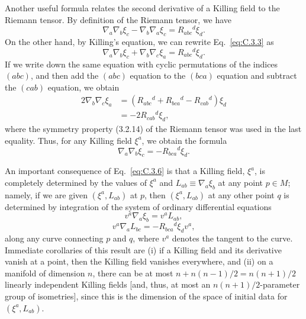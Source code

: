 Another useful formula relates the second derivative of a Killing field to the Riemann
tensor. By definition of the Riemann tensor, we have
\begin{equation}
  \nabla_a\nabla_b\xi_c-\nabla_b\nabla_a\xi_c
  =R_{abc}{}^d\xi_d.
  \tag{C.3.3}\label{eq:C.3.3}
\end{equation}
On the other hand, by Killing's equation, we can rewrite Eq.~\eqref{eq:C.3.3} as
\begin{equation}
  \nabla_a\nabla_b\xi_c+\nabla_b\nabla_c\xi_a
  =R_{abc}{}^d\xi_d.
  \tag{C.3.4}\label{eq:C.3.4}
\end{equation}
If we write down the same equation with cyclic permutations of the indices \((abc)\),
and then add the \((abc)\) equation to the \((bca)\) equation and subtract the
\((cab)\) equation, we obtain
\begin{equation}
\begin{aligned}
  2\nabla_b\nabla_c\xi_a
  &=(R_{abc}{}^d+R_{bca}{}^d-R_{cab}{}^d)\xi_d\\
  &=-2R_{cab}{}^d\xi_d,
\end{aligned}
  \tag{C.3.5}\label{eq:C.3.5}
\end{equation}
where the symmetry property (3.2.14) of the Riemann tensor was used in the last
equality. Thus, for any Killing field \(\xi^a\), we obtain the formula
\begin{equation}
  \nabla_a\nabla_b\xi_c=-R_{bca}{}^d\xi_d.
  \tag{C.3.6}\label{eq:C.3.6}
\end{equation}

An important consequence of Eq.~\eqref{eq:C.3.6} is that a Killing field, \(\xi^a\),
is completely determined by the values of \(\xi^a\) and
\(L_{ab}\equiv\nabla_a\xi_b\) at any point \(p\in M\); namely, if we are given
\((\xi^a,L_{ab})\) at \(p\), then \((\xi^a,L_{ab})\) at any other point \(q\) is
determined by integration of the system of ordinary differential equations
\begin{equation}
  v^a\nabla_a\xi_b=v^aL_{ab},
  \tag{C.3.7}\label{eq:C.3.7}
\end{equation}
\begin{equation}
  v^a\nabla_aL_{bc}=-R_{bca}{}^d\xi_dv^a,
  \tag{C.3.8}\label{eq:C.3.8}
\end{equation}
along any curve connecting \(p\) and \(q\), where \(v^a\) denotes the tangent to the
curve. Immediate corollaries of this result are (i) if a Killing field and its
derivative vanish at a point, then the Killing field vanishes everywhere, and (ii) on
a manifold of dimension \(n\), there can be at most
\(n+n(n-1)/2=n(n+1)/2\) linearly independent Killing fields [and, thus, at most an
\(n(n+1)/2\)-parameter group of isometries], since this is the dimension of the
space of initial data for \((\xi^a,L_{ab})\).

